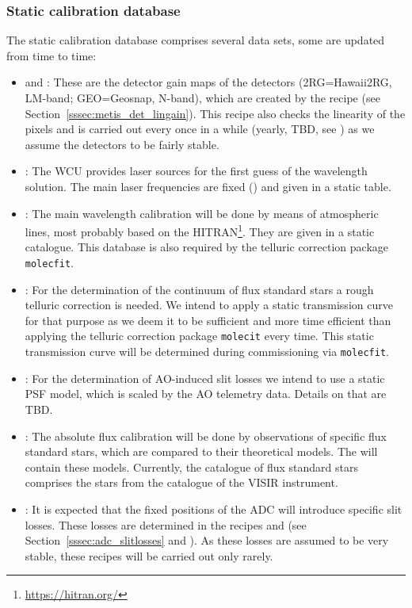 \subsubsection{Static calibration database}\label{lss:static_calib}
The static calibration database comprises several data sets, some are updated from time to time:
\begin{itemize}
    \item {} and : These are the detector gain maps of the detectors (2RG=Hawaii2RG, LM-band; GEO=Geosnap, N-band), which are created by the recipe  (see Section~\ref{sssec:metis_det_lingain}). This recipe also checks the linearity of the pixels and is carried out every once in a while (yearly, TBD, see \cite{METIS-calibration_plan}) as we assume the detectors to be fairly stable.
    \item {}: The \ac{WCU} provides laser sources for the first guess of the wavelength solution. The main laser frequencies are fixed (\cite{METIS-calibration_plan}) and given in a static table.
    \item {}: The main wavelength calibration will be done by means of atmospheric lines, most probably based on the \ac{HITRAN}\footnote{\url{https://hitran.org/}}. They are given in a static catalogue. This database is also required by the telluric correction package \texttt{molecfit}.
    \item {}: For the determination of the continuum of flux standard stars a rough telluric correction is needed. We intend to apply a static transmission curve  for that purpose as we deem it to be sufficient and more time efficient than applying the telluric correction package \texttt{molecit} every time. This static transmission curve will be determined during commissioning via \texttt{molecfit}.
    \item {}: For the determination of \ac{AO}-induced slit losses we intend to use a static \ac{PSF} model, which is scaled by the \ac{AO} telemetry data. Details on that are TBD.
    \item {}: The absolute flux calibration will be done by observations of specific flux standard stars, which are compared to their theoretical models. The  will contain these models. Currently, the catalogue of flux standard stars comprises the stars from the catalogue of the \ac{VISIR} instrument.
    \item {}: It is expected that the fixed positions of the \ac{ADC} will introduce specific slit losses. These losses are determined in the recipes  and  (see Section~\ref{sssec:adc_slitlosses} and \cite{METIS-calibration_plan}). As these losses are assumed to be very stable, these recipes will be carried out only rarely.

\end{itemize}
